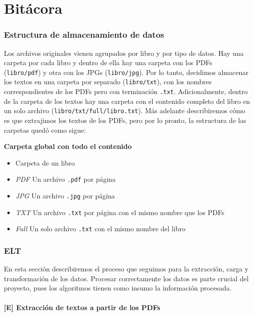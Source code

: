 \chapter{Bitácora}
\label{bitacora}


\subsection{Estructura de almacenamiento de
datos}\label{estructura-de-almacenamiento-de-datos}

Los archivos originales vienen agrupados por libro y por tipo de datos.
Hay una carpeta por cada libro y dentro de ella hay una carpeta con los
PDFs (\texttt{libro/pdf}) y otra con los JPGs (\texttt{libro/jpg}). Por
lo tanto, decidimos almacenar los textos en una carpeta por separado
(\texttt{libro/txt}), con los nombres correspondientes de los PDFs pero
con terminación \texttt{.txt}. Adicionalmente, dentro de la carpeta de
los textos hay una carpeta con el contenido completo del libro en un
solo archivo (\texttt{libro/txt/full/libro.txt}). Más adelante
describiremos cómo es que extrajimos los textos de los PDFs, pero por lo
pronto, la estructura de las carpetas quedó como sigue:

\textbf{Carpeta global con todo el contenido}

\begin{itemize}
\itemsep1pt\parskip0pt
\item
  Carpeta de un libro
\item
  \emph{PDF} Un archivo \texttt{.pdf} por página
\item
  \emph{JPG} Un archivo \texttt{.jpg} por página
\item
  \emph{TXT} Un archivo \texttt{.txt} por página con el mismo nombre que
  los PDFs
\item
  \emph{Full} Un solo archivo \texttt{.txt} con el mismo nombre del
  libro
\end{itemize}

\subsection{ELT}\label{elt}

En esta sección describiremos el proceso que seguimos para la
extracción, carga y transformación de los datos. Procesar correctamente
los datos es parte crucial del proyecto, pues los algoritmos tienen como
insumo la información procesada.

\subsubsection{{[}E{]} Extracción de textos a partir de los
PDFs}\label{e-extraccion-de-textos-a-partir-de-los-pdfs}

